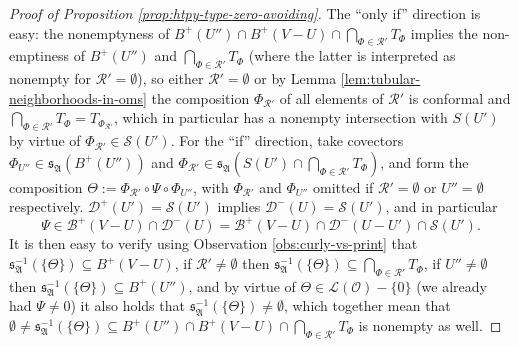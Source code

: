 \documentclass[a4paper,11pt,reqno, english]{amsart}
\theoremstyle{definition}
\theoremstyle{remark}
\begin{document}
\begin{proof}[Proof of Proposition \ref{prop:htpy-type-zero-avoiding}]
    The ``only if'' direction is easy: the nonemptyness of $B^+(U'')\cap B^+(V-U)\cap\bigcap_{\Phi\in\mathscr{R}'}T_\Phi$ implies the non-emptiness of $B^+(U'')$ and $\bigcap_{\Phi\in\mathscr{R}'}T_\Phi$ (where the latter is interpreted as nonempty for $\mathscr{R}'=\emptyset$), so either $\mathscr{R}'=\emptyset$ or by Lemma \ref{lem:tubular-neighborhoods-in-oms} the composition $\Phi_{\mathscr{R}'}$ of all elements of $\mathscr{R}'$ is conformal and $\bigcap_{\Phi\in \mathscr{R}'}T_\Phi=T_{\Phi_{\mathscr{R}'}}$, which in particular has a nonempty intersection with $S(U')$ by virtue of $\Phi_{\mathscr{R}'}\in \mathscr{S}(U')$. For the ``if'' direction, take covectors $\Phi_{U''}\in\mathfrak{s}_\mathfrak{A}(B^+(U''))$ and $\Phi_{\mathscr{R}'}\in\mathfrak{s}_{\mathfrak{A}}(S(U')\cap\bigcap_{\Phi\in\mathscr{R}'}T_\Phi)$, and form the composition $\Theta:=\Phi_{\mathscr{R}'}\circ\Psi\circ\Phi_{U''}$, with $\Phi_{\mathscr{R}'}$ and $\Phi_{U''}$ omitted if $\mathscr{R}'=\emptyset$ or $U''=\emptyset$ respectively. 
    $\mathscr{D}^+(U')=\mathscr{S}(U')$ implies $\mathscr{D}^-(U)=\mathscr{S}(U')$, and in particular 
    \[
    \Psi\in\mathscr{B}^+(V-U)\cap\mathscr{D}^-(U)=\mathscr{B}^+(V-U)\cap\mathscr{D}^-(U-U')\cap\mathscr{S}(U'). 
    \]
    It is then easy to verify using Observation \ref{obs:curly-vs-print} that $\mathfrak{s}_\mathfrak{A}^{-1}(\{\Theta\})\subseteq B^+(V-U)$, if $\mathscr{R}'\neq\emptyset$ then $\mathfrak{s}_\mathfrak{A}^{-1}(\{\Theta\})\subseteq\bigcap_{\Phi\in\mathscr{R}'}T_\Phi$, if $U''\neq\emptyset$ then $\mathfrak{s}_\mathfrak{A}^{-1}(\{\Theta\})\subseteq B^+(U'')$, and by virtue of $\Theta\in\mathscr{L}(\mathscr{O})-\{0\}$ (we already had $\Psi\neq 0$) it also holds that $\mathfrak{s}_\mathfrak{A}^{-1}(\{\Theta\})\neq\emptyset$, which together mean that $\emptyset\neq\mathfrak{s}_\mathfrak{A}^{-1}(\{\Theta\})\subseteq B^+(U'')\cap B^+(V-U)\cap\bigcap_{\Phi\in\mathscr{R}'}T_\Phi$ is nonempty as well. 
\end{proof}
\end{document}
